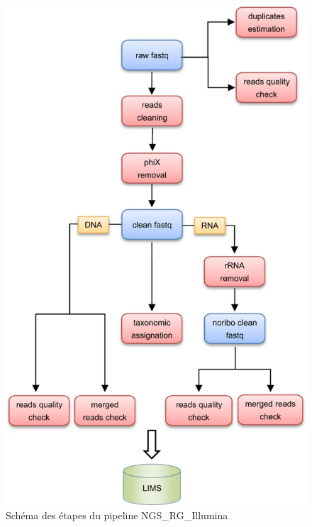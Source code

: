 \begin{minipage}{0.45\textwidth}
    \begin{figure}[H]
        \centering
        \includegraphics[width=1\textwidth]{img/schema-workflow-ngsqc.png}
        \caption{\footnotesize{Schéma des étapes du pipeline NGS\_RG\_Illumina}}
        \label{schema-workflow-ngsqc}
    \end{figure}
\end{minipage}
\hfill
